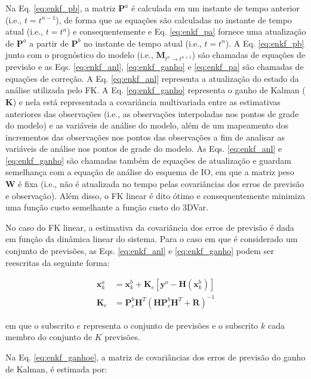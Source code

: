 Na Eq. \ref{eq:enkf_pb}, a matriz $\mathbf{P}^{a}$ é calculada em um instante de tempo anterior (i.e., $t=t^{n-1}$), de forma que as equações são calculadas no instante de tempo atual (i.e., $t=t^{n}$) e consequentemente e Eq. \ref{eq:enkf_pa} fornece uma atualização de $\mathbf{P}^{a}$ a partir de $\mathbf{P}^{b}$ no instante de tempo atual (i.e., $t=t^{n}$). A Eq. \ref{eq:enkf_pb} junto com o prognóstico do modelo (i.e., $\mathbf{M}_{t^{n} \rightarrow t^{n+1}}$) são chamadas de equações de previsão e as Eqs. \ref{eq:enkf_anl}, \ref{eq:enkf_ganho} e \ref{eq:enkf_pa} são chamadas de equações de correção. A Eq. \ref{eq:enkf_anl} representa a atualização do estado da análise utilizada pelo FK. A Eq. \ref{eq:enkf_ganho} representa o ganho de Kalman ($\mathbf{K}$) e nela está representada a covariância multivariada entre as estimativas anteriores das observações (i.e., as observações interpoladas nos pontos de grade do modelo) e as variáveis de análise do modelo, além de um mapeamento dos incrementos das observações nos pontos das observações a fim de analisar as variáveis de análise nos pontos de grade do modelo. As Eqs. \ref{eq:enkf_anl} e \ref{eq:enkf_ganho} são chamadas também de equações de atualização e guardam semelhança com a equação de análise do esquema de IO, em que a matriz peso $\mathbf{W}$ é fixa (i.e., não é atualizada no tempo pelas covariâncias dos erros de previsão e observação). Além disso, o FK linear é dito ótimo e consequentemente minimiza uma função custo semelhante a função custo do 3DVar.

No caso do FK linear, a estimativa da covariância dos erros de previsão é dada em função da dinâmica linear do sistema. Para o caso em que é considerado um conjunto de previsões, as Eqs. \ref{eq:enkf_anl} e \ref{eq:enkf_ganho} podem ser reescritas da seguinte forma:

\begin{align}
    \label{eq:enkf_anle}
    \mathbf{x}^{a}_{k} & = {\mathbf{x}^{b}_{k}} + \mathbf{K}_{e}[\mathbf{y}^{o}-{\mathbf{H}(\mathbf{x}^{b}_{k})}] \\
    \label{eq:enkf_ganhoe}
    \mathbf{K}_{e} & = {\mathbf{P}^{b}_{e}}\mathbf{H}^{T}({\mathbf{H}\mathbf{P}^{b}_{e}}\mathbf{H}^{T}+\mathbf{R})^{-1}
\end{align}

em que o subscrito $e$ representa o conjunto de previsões e o subscrito $k$ cada membro do conjunto de $K$ previsões.

Na Eq. \ref{eq:enkf_ganhoe}, a matriz de covariâncias dos erros de previsão do ganho de Kalman, é estimada por:

